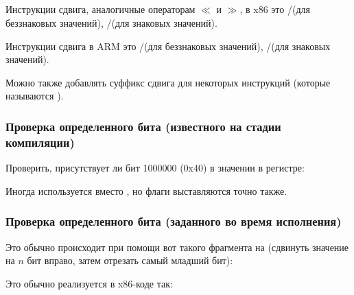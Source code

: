 ﻿%
\subsection{\Conclusion{}}

Инструкции сдвига, аналогичные операторам \CCpp $\ll$ и $\gg$, в x86 это \SHR/\SHL (для беззнаковых значений), \SAR/\SHL (для знаковых значений).

Инструкции сдвига в ARM это \LSR/\LSL (для беззнаковых значений), \ASR/\LSL (для знаковых значений).

Можно также добавлять суффикс сдвига для некоторых инструкций 
(которые называются ).


\subsubsection{Проверка определенного бита (известного на стадии компиляции)}

Проверить, присутствует ли бит 1000000 (0x40) в значении в регистре:









Иногда \AND используется вместо \TEST, но флаги выставляются точно также.

\subsubsection{Проверка определенного бита (заданного во время исполнения)}

Это обычно происходит при помощи вот такого фрагмента на \CCpp (сдвинуть значение на $n$ бит вправо,
затем отрезать самый младший бит):



Это обычно реализуется в x86-коде так:

